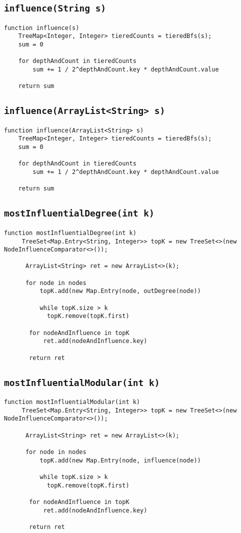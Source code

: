 \documentclass[10pt,letterpaper]{article}
\begin{document}
\subsection{\texttt{influence(String s)}}
\begin{verbatim}
function influence(s)
    TreeMap<Integer, Integer> tieredCounts = tieredBfs(s);
    sum = 0

    for depthAndCount in tieredCounts
        sum += 1 / 2^depthAndCount.key * depthAndCount.value

    return sum
\end{verbatim}
\subsection{\texttt{influence(ArrayList<String> s)}}
\begin{verbatim}
function influence(ArrayList<String> s)
    TreeMap<Integer, Integer> tieredCounts = tieredBfs(s);
    sum = 0

    for depthAndCount in tieredCounts
        sum += 1 / 2^depthAndCount.key * depthAndCount.value

    return sum
\end{verbatim}
\subsection{\texttt{mostInfluentialDegree(int k)}}
\begin{verbatim}
function mostInfluentialDegree(int k)
     TreeSet<Map.Entry<String, Integer>> topK = new TreeSet<>(new NodeInfluenceComparator<>());
     
      ArrayList<String> ret = new ArrayList<>(k);
      
      for node in nodes
          topK.add(new Map.Entry(node, outDegree(node))
          
          while topK.size > k
          	topK.remove(topK.first)
       
       for nodeAndInfluence in topK
           ret.add(nodeAndInfluence.key)
       
       return ret
\end{verbatim}
\subsection{\texttt{mostInfluentialModular(int k)}}
\begin{verbatim}
function mostInfluentialModular(int k)
     TreeSet<Map.Entry<String, Integer>> topK = new TreeSet<>(new NodeInfluenceComparator<>());
     
      ArrayList<String> ret = new ArrayList<>(k);
      
      for node in nodes
          topK.add(new Map.Entry(node, influence(node))
          
          while topK.size > k
          	topK.remove(topK.first)
       
       for nodeAndInfluence in topK
           ret.add(nodeAndInfluence.key)
       
       return ret
\end{verbatim}
\end{document}

